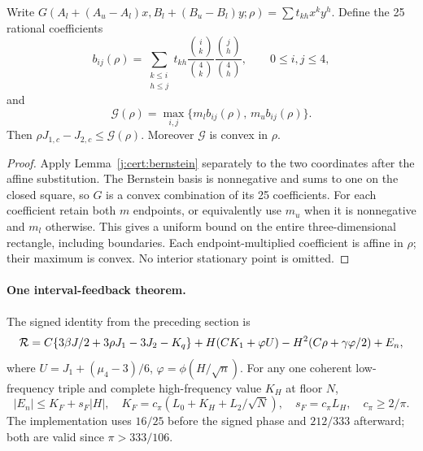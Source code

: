 \begin{lemma}\label{j:local:entry201:central}
Write $G(A_l+(A_u-A_l)x,B_l+(B_u-B_l)y;\rho)
=\sum t_{kh}x^ky^h$. Define the 25 rational coefficients
\[
 b_{ij}(\rho)=\sum_{\substack{k\le i\\h\le j}}
 t_{kh}\frac{\binom{i}{k}}{\binom4k}
          \frac{\binom{j}{h}}{\binom4h},\qquad 0\le i,j\le4,
\]
and
\[
 \mathcal G(\rho)=\max_{i,j}
       \{m_l b_{ij}(\rho),\,m_u b_{ij}(\rho)\}.
\]
Then $\rho J_{1,c}-J_{2,c}\le\mathcal G(\rho)$.
Moreover $\mathcal G$ is convex in $\rho$.
\end{lemma}
\begin{proof}
Apply Lemma~\ref{j:cert:bernstein} separately to the
two coordinates after the affine substitution. The Bernstein basis is nonnegative and sums to one on the closed square,
so $G$ is a convex combination of its 25 coefficients.
For each coefficient retain both $m$ endpoints, or equivalently use
$m_u$ when it is nonnegative and $m_l$ otherwise. This gives a uniform
bound on the entire three-dimensional rectangle, including boundaries.
Each endpoint-multiplied coefficient is affine in $\rho$; their maximum
is convex. No interior stationary point is omitted.
\end{proof}



\paragraph{One interval-feedback theorem.}
\label{j:local:entry:feedback}\label{j:local:fourier:uniform}

The signed identity from the preceding section is
\begin{equation}\label{j:local:entry:remainder}
 \mathcal R=C\{3\beta J/2+3\rho J_1-3J_2-K_q\}
 +H(CK_1+\varphi U)-H^2(C\rho+\gamma\varphi/2)+E_n,
\end{equation}
where $U=J_1+(\mu_4-3)/6$, $\varphi=\phi(H/\sqrt n)$.
For any one coherent low-frequency triple and complete high-frequency value $K_H$ at floor $N$,
\begin{equation}\label{j:local:entry:fourier-budget}
 |E_n|\le K_F+s_F|H|,\quad
 K_F=c_\pi(L_0+K_H+L_2/\sqrt N),\quad s_F=c_\pi L_H,\quad c_\pi\ge2/\pi.
\end{equation}
The implementation uses $16/25$ before the signed phase and $212/333$
afterward; both are valid since $\pi>333/106$.

